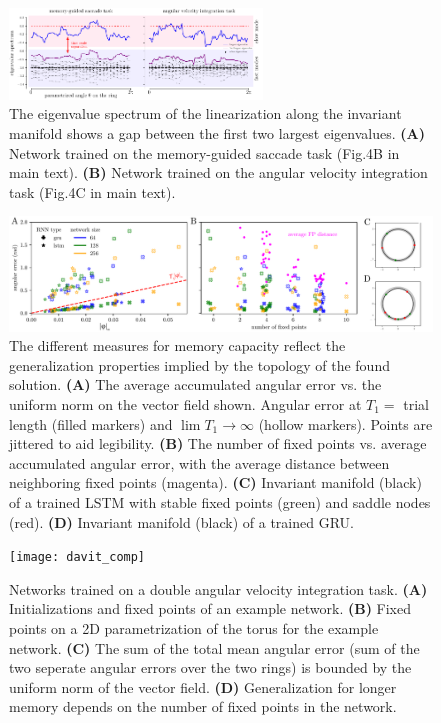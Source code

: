 \documentclass[letterpaper]{article}
\begin{document}
\begin{figure}[tbhp]
  \centering
  \includegraphics[width=0.6\textwidth]{eigenvalue_gap_comp}
  \caption{The eigenvalue spectrum of the linearization along the invariant manifold shows a gap between the first two largest eigenvalues.
    \textbf{(A)} Network trained on the memory-guided saccade task (Fig.4B in main text).
    \textbf{(B)} Network trained on the angular velocity integration task (Fig.4C in main text).
}\label{fig:eigenvalue_gap}
\end{figure}




\begin{figure}[tbhp]
  \centering
  \includegraphics[width=.9\textwidth]{angular_losses_lstm_gru}
  \caption{The different measures for memory capacity reflect the generalization properties implied by the topology of the found solution.
    \textbf{(A)} The average accumulated angular error vs. the uniform norm on the vector field shown.
     Angular error at \(T_1 =\) trial length (filled markers) and \(\lim T_{1} \to \infty\)  (hollow markers).
      Points are jittered to aid legibility.
    \textbf{(B)} The number of fixed points vs. average accumulated angular error, with the average distance between neighboring fixed points (magenta).
    \textbf{(C)} Invariant manifold (black) of a trained LSTM with stable fixed points (green) and saddle nodes (red).
    \textbf{(D)} Invariant manifold (black) of a trained GRU.
}\label{fig:angular_losses_lstm_gru}
\end{figure}



\begin{figure}[tbhp]
  \centering
  \texttt{[image: davit\_comp]}
  \caption{Networks trained on a double angular velocity integration task.
    \textbf{(A)} Initializations and fixed points of an example network.
    \textbf{(B)} Fixed points on a 2D parametrization of the torus for the example network.
    \textbf{(C)} The sum of the total mean angular error (sum of the two seperate angular errors over the two rings) is bounded by the uniform norm of the vector field.
    \textbf{(D)} Generalization for longer memory depends on the number of fixed points in the network.
}\label{fig:davit}
\end{figure}
\end{document}
